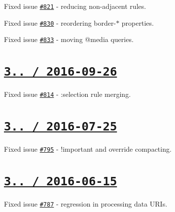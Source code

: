 \begin{DoxyItemize}
\item Fixed issue \href{https://github.com/jakubpawlowicz/clean-css/issues/821}{\tt \#821} -\/ reducing non-\/adjacent rules.
\item Fixed issue \href{https://github.com/jakubpawlowicz/clean-css/issues/830}{\tt \#830} -\/ reordering border-\/$\ast$ properties.
\item Fixed issue \href{https://github.com/jakubpawlowicz/clean-css/issues/833}{\tt \#833} -\/ moving {\ttfamily @media} queries.
\end{DoxyItemize}

\section*{\href{https://github.com/jakubpawlowicz/clean-css/compare/v3.4.19...v3.4.20}{\tt 3.. / 2016-\/09-\/26} }


\begin{DoxyItemize}
\item Fixed issue \href{https://github.com/jakubpawlowicz/clean-css/issues/814}{\tt \#814} -\/ {\ttfamily \+:selection} rule merging.
\end{DoxyItemize}

\section*{\href{https://github.com/jakubpawlowicz/clean-css/compare/v3.4.18...v3.4.19}{\tt 3.. / 2016-\/07-\/25} }


\begin{DoxyItemize}
\item Fixed issue \href{https://github.com/jakubpawlowicz/clean-css/issues/795}{\tt \#795} -\/ {\ttfamily !important} and override compacting.
\end{DoxyItemize}

\section*{\href{https://github.com/jakubpawlowicz/clean-css/compare/v3.4.17...v3.4.18}{\tt 3.. / 2016-\/06-\/15} }


\begin{DoxyItemize}
\item Fixed issue \href{https://github.com/jakubpawlowicz/clean-css/issues/787}{\tt \#787} -\/ regression in processing data U\+R\+Is.
\end{DoxyItemize}

